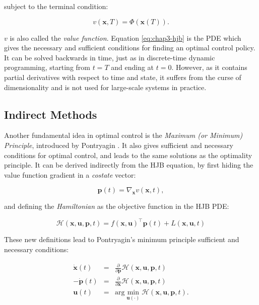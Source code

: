 subject to the terminal condition:

\begin{equation}
\label{eq:chap3-hjb-cond}
v(\mathbf{x},T)=\Phi(\mathbf{x}(T)).
\end{equation}

$v$ is also called the \emph{value function}. Equation
\ref{eq:chap3-hjb} is the PDE which gives the necessary and sufficient
conditions for finding an optimal control policy. It can be solved
backwards in time, just as in discrete-time dynamic programming,
starting from $t=T$ and ending at $ t=0$. However, as it contains
partial derivatives with respect to time and state, it suffers from
the curse of dimensionality and is not used for large-scale systems in
practice.

\subsection{Indirect Methods}

Another fundamental idea in optimal control is the \emph{Maximum (or
  Minimum) Principle}, introduced by Pontryagin
\cite{boltyanskii1960theory}. It also gives sufficient and necessary
conditions for optimal control, and leads to the same solutions as the
optimality principle. It can be derived indirectly from the HJB
equation, by first hiding the value function gradient in a
\emph{costate} vector:

\begin{equation}
  \mathbf{p}(t) = \nabla_{\mathbf{x}} v(\mathbf{x},t),
\end{equation} 

and defining the \emph{Hamiltonian} as the objective function in the
HJB PDE:

\begin{equation}
  \mathcal{H}(\mathbf{x},\mathbf{u},\mathbf{p},t) = f(\mathbf{x},
  \mathbf{u})^{\top}\mathbf{p}(t) + L (\mathbf{x}, \mathbf{u},t)
\end{equation}

These new definitions lead to Pontryagin's minimum principle
sufficient and necessary conditions:

\begin{equation}
\begin{array}{rcl}
\dot{\mathbf{x}}(t) &=&
\frac{\partial}{\partial\mathbf{p}}\mathcal{H}(\mathbf{x},\mathbf{u},\mathbf{p},t)
\\ -\dot{\mathbf{p}}(t) &=&
\frac{\partial}{\partial\mathbf{x}}\mathcal{H}(\mathbf{x},\mathbf{u},\mathbf{p},t)
\\ \mathbf{u}(t) &=&
\text{arg}\min_{\mathbf{u}(\cdot)}\mathcal{H}(\mathbf{x},\mathbf{u},\mathbf{p},t).
\end{array}
\end{equation}

